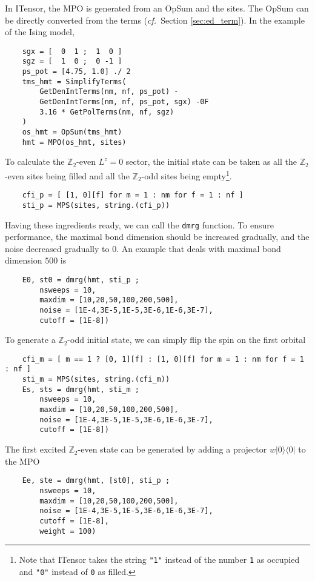 \documentclass{timesjhep}
\begin{document}
In ITensor, the MPO is generated from an OpSum and the sites. The OpSum can be directly converted from the terms (\textit{cf.}~Section \ref{sec:ed_term}). In the example of the Ising model,
\begin{lstlisting}
    sgx = [  0  1 ;  1  0 ]
    sgz = [  1  0 ;  0 -1 ]
    ps_pot = [4.75, 1.0] ./ 2
    tms_hmt = SimplifyTerms(
        GetDenIntTerms(nm, nf, ps_pot) -
        GetDenIntTerms(nm, nf, ps_pot, sgx) -0F
        3.16 * GetPolTerms(nm, nf, sgz)
    )
    os_hmt = OpSum(tms_hmt)
    hmt = MPO(os_hmt, sites)
\end{lstlisting}

To calculate the $\mathbb{Z}_2$-even $L^z=0$ sector, the initial state can be taken as all the $\mathbb{Z}_2$-even sites being filled and all the $\mathbb{Z}_2$-odd sites being empty\footnote{Note that ITensor takes the string \lstinline|"1"| instead of the number \lstinline|1| as occupied and \lstinline|"0"| instead of \lstinline|0| as filled.}.
\begin{lstlisting}
    cfi_p = [ [1, 0][f] for m = 1 : nm for f = 1 : nf ]
    sti_p = MPS(sites, string.(cfi_p))
\end{lstlisting}

Having these ingredients ready, we can call the \lstinline|dmrg| function. To ensure performance, the maximal bond dimension should be increased gradually, and the noise decreased gradually to 0. An example that deals with maximal bond dimension $500$ is
\begin{lstlisting}
    E0, st0 = dmrg(hmt, sti_p ;
        nsweeps = 10,
        maxdim = [10,20,50,100,200,500],
        noise = [1E-4,3E-5,1E-5,3E-6,1E-6,3E-7],
        cutoff = [1E-8])
\end{lstlisting}
To generate a $\mathbb{Z}_2$-odd initial state, we can simply flip the spin on the first orbital
\begin{lstlisting}
    cfi_m = [ m == 1 ? [0, 1][f] : [1, 0][f] for m = 1 : nm for f = 1 : nf ]
    sti_m = MPS(sites, string.(cfi_m))
    Es, sts = dmrg(hmt, sti_m ;
        nsweeps = 10,
        maxdim = [10,20,50,100,200,500],
        noise = [1E-4,3E-5,1E-5,3E-6,1E-6,3E-7],
        cutoff = [1E-8])
\end{lstlisting}
The first excited $\mathbb{Z}_2$-even state can be generated by adding a projector $w|0\rangle\langle0|$ to the MPO
\begin{lstlisting}
    Ee, ste = dmrg(hmt, [st0], sti_p ;
        nsweeps = 10,
        maxdim = [10,20,50,100,200,500],
        noise = [1E-4,3E-5,1E-5,3E-6,1E-6,3E-7],
        cutoff = [1E-8],
        weight = 100)
\end{lstlisting}
\end{document}
